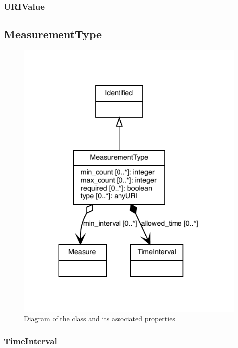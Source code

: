 \subsubsection{URIValue}
\label{sec:URIValue}



\subsection{MeasurementType}
\label{sec:MeasurementType}

\begin{figure}[ht]
\begin{center}
\includegraphics[scale=0.6]{figures/MeasurementType}
\caption[]{Diagram of the  class and its associated properties}
\label{uml:MeasurementType}
\end{center}
\end{figure}

\subsubsection{TimeInterval}
\label{sec:TimeInterval}


